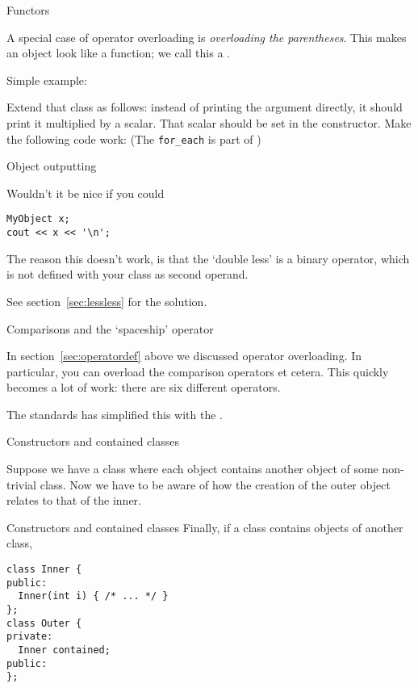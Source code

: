  {Functors}

A special case of operator overloading is
%
\emph{overloading the parentheses}. This makes an object look like a
function; we call this a .

Simple example:
%

\begin{exercise}
  \label{ex:functor2}
  Extend that class as follows: instead of printing the argument
  directly, it should print it multiplied by a scalar. That scalar
  should be set in the constructor. Make the following code work:
  (The \lstinline{for_each} is part of )
\end{exercise}


 {Object outputting}
\label{sec:cout-object}

Wouldn't it be nice if you could
\begin{lstlisting}
MyObject x;
cout << x << '\n';
\end{lstlisting}
The reason this doesn't work, is that the `double less'
is a binary operator, which is not defined
with your class as second operand.

See section~\ref{sec:lessless} for the solution.

 {Comparisons and the `spaceship' operator}

In section~\ref{sec:operatordef} above we discussed operator overloading.
In particular, you can overload the comparison operators \n{<,=,>} et cetera.
This quickly becomes a lot of work: there are six different operators.

The  standards has simplified this with
the .


 {Constructors and contained classes}

Suppose we have a class where each object contains
another object of some non-trivial class.
Now we have to be aware of how the creation of the
outer object relates to that of the inner.

\begin{block}{Constructors and contained classes}
  \label{sl:construct-contained1}
  Finally, if a class contains objects of another class,
  \lstset{style=snippetcode}
\begin{lstlisting}
class Inner {
public:
  Inner(int i) { /* ... */ }
};
class Outer {
private:
  Inner contained;
public:
};
\end{lstlisting}
\end{block}

